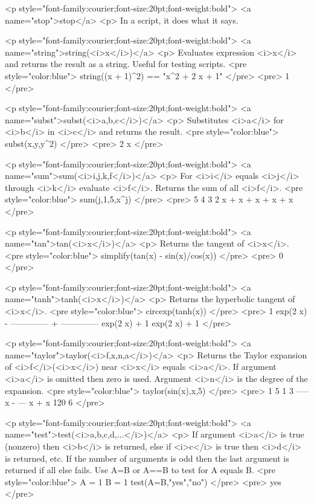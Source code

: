 <p style="font-family:courier;font-size:20pt;font-weight:bold">
<a name="stop">stop</a>
<p>
In a script, it does what it says.

<p style="font-family:courier;font-size:20pt;font-weight:bold">
<a name="string">string(<i>x</i>)</a>
<p>
Evaluates expression <i>x</i> and returns the result as a string.
Useful for testing scripts.
<pre style="color:blue">
string((x + 1)^2) == "x^2 + 2 x + 1"
</pre>
<pre>
1
</pre>

<p style="font-family:courier;font-size:20pt;font-weight:bold">
<a name="subst">subst(<i>a,b,c</i>)</a>
<p>
Substitutes <i>a</i> for <i>b</i> in <i>c</i> and returns the result.
<pre style="color:blue">
subst(x,y,y^2)
</pre>
<pre>
 2
x
</pre>

<p style="font-family:courier;font-size:20pt;font-weight:bold">
<a name="sum">sum(<i>i,j,k,f</i>)</a>
<p>
For <i>i</i> equals <i>j</i> through <i>k</i> evaluate <i>f</i>.
Returns the sum of all <i>f</i>.
<pre style="color:blue">
sum(j,1,5,x^j)
</pre>
<pre>
 5    4    3    2
x  + x  + x  + x  + x
</pre>

<p style="font-family:courier;font-size:20pt;font-weight:bold">
<a name="tan">tan(<i>x</i>)</a>
<p>
Returns the tangent of <i>x</i>.
<pre style="color:blue">
simplify(tan(x) - sin(x)/cos(x))
</pre>
<pre>
0
</pre>

<p style="font-family:courier;font-size:20pt;font-weight:bold">
<a name="tanh">tanh(<i>x</i>)</a>
<p>
Returns the hyperbolic tangent of <i>x</i>.
<pre style="color:blue">
circexp(tanh(x))
</pre>
<pre>
        1             exp(2 x)
- -------------- + --------------
   exp(2 x) + 1     exp(2 x) + 1
</pre>

<p style="font-family:courier;font-size:20pt;font-weight:bold">
<a name="taylor">taylor(<i>f,x,n,a</i>)</a>
<p>
Returns the Taylor expansion of <i>f</i>(<i>x</i>) near <i>x</i> equals <i>a</i>.
If argument <i>a</i> is omitted then zero is used.
Argument <i>n</i> is the degree of the expansion.
<pre style="color:blue">
taylor(sin(x),x,5)
</pre>
<pre>
  1    5    1   3
----- x  - --- x  + x
 120        6
</pre>

<p style="font-family:courier;font-size:20pt;font-weight:bold">
<a name="test">test(<i>a,b,c,d,...</i>)</a>
<p>
If argument <i>a</i> is true (nonzero) then <i>b</i> is returned,
else if <i>c</i> is true then <i>d</i> is returned, etc.
If the number of arguments is odd then the last argument is returned
if all else fails.
Use A=B or A==B to test for A equals B.
<pre style="color:blue">
A = 1
B = 1
test(A=B,"yes","no")
</pre>
<pre>
yes
</pre>

